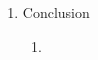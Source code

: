 \begin{enumerate}
        \item Conclusion
        \begin{enumerate}
            \item 
        \end{enumerate}
        
    \end{enumerate}
\fi